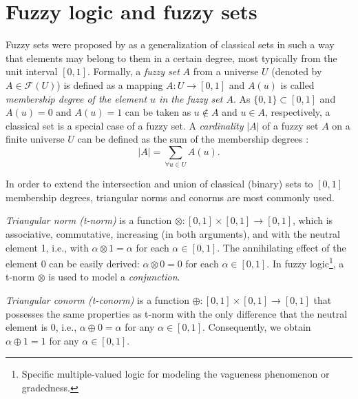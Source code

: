 \documentclass[review]{elsarticle}
\begin{document}




\section{Fuzzy logic and fuzzy sets}
\label{sec:fuzzysets}

Fuzzy sets were proposed by \cite{Zadeh65} as a generalization of classical sets in such a way that elements may belong to them in a certain degree, most typically from the unit interval $[0,1]$. Formally, a \emph{fuzzy set} $A$ from a universe $U$ (denoted by $A\in\mathcal{F}(U)$) is defined as a mapping $A: U \to [0, 1]$ and $A(u)$ is called \emph{membership degree of the element $u$ in the fuzzy set $A$}. As $\{0,1\} \subset [0,1]$ and $A(u)= 0$ and $A(u) = 1$ can be taken as $u \notin A$ and $u\in A$, respectively, a classical set is a special case of a fuzzy set. A \emph{cardinality} $|A|$ of a fuzzy set $A$ on a finite universe $U$ can be defined as
the sum of the membership degrees \citep{novak1999}:
%
$$|A| = \sum_{\forall u\in U} A(u).$$



In order to extend the intersection and union of classical (binary) sets to $[0,1]$ membership degrees, triangular norms and conorms are most commonly used. 

\emph{Triangular norm (t-norm)} is a function $\otimes: [0,1] \times [0,1] \to [0,1]$,
which is associative, commutative, increasing (in both
arguments), and with the neutral element 1, i.e., with $\alpha \otimes 1 = \alpha$ for each $\alpha \in [0, 1]$. The annihilating effect of the element 0 can be easily derived: $\alpha \otimes 0 = 0$ for each $\alpha \in [0, 1]$. In fuzzy logic\footnote{Specific multiple-valued logic for modeling the vagueness phenomenon or gradedness.}, a t-norm $\otimes$ is used to model a \emph{conjunction}.

\emph{Triangular conorm (t-conorm)} is a function $\oplus: [0,1] \times [0,1] \to [0,1]$ that possesses the same properties as t-norm with the only difference that the neutral element is 0, i.e., $\alpha \oplus 0 = \alpha$ for any $\alpha \in [0,1]$. Consequently, we obtain $\alpha \oplus 1 = 1$ for any $\alpha \in [0,1]$.
  
\end{document}

